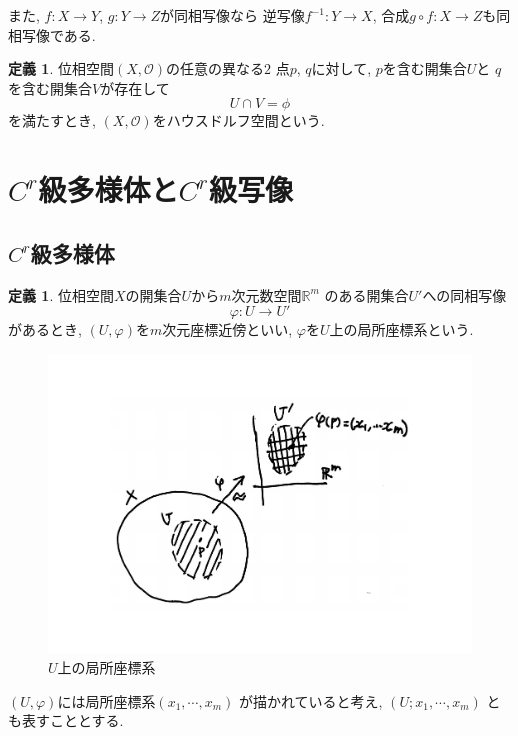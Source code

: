 \documentclass[a4j,12pt]{jarticle}
\theoremstyle{definition}
\newtheorem{definition}[theorem]{定義}
\begin{document}
また, $f:X\to Y$, $g:Y\to Z$が同相写像なら
逆写像$f^{-1}:Y\to X$, 
合成$g\circ f:X\to Z$も同相写像である. 

\begin{definition}\label{def:hausdorff space}
    位相空間$(X,\mathcal{O})$の任意の異なる$2$
    点$p$, $q$に対して, $p$を含む開集合$U$と
    $q$を含む開集合$V$が存在して
    $$U\cap V=\phi$$
    を満たすとき, 
    $(X,\mathcal{O})$をハウスドルフ空間という. 
\end{definition}
\newpage
%
\section{$C^r$級多様体と$C^r$級写像}
\subsection{$C^r$級多様体}
\begin{definition}
    位相空間$X$の開集合$U$から$m$次元数空間$\mathbb{R}^m$
    のある開集合$U'$への同相写像
    $$\varphi:U\rightarrow U'$$
    があるとき, $(U, \varphi)$を$m$次元座標近傍といい, 
    $\varphi$を$U$上の局所座標系という. 
\end{definition}
\begin{figure}[H]
    \centering
    \includegraphics[keepaspectratio, scale=0.4]
    {coNeighborhoodBig.pdf}
    \caption{$U$上の局所座標系}
    \label{coNeighborhood}
   \end{figure}
$(U,\varphi)$には局所座標系$(x_1, \cdots ,x_m)$
    が描かれていると考え, $(U;x_1, \cdots ,x_m)$
    とも表すこととする. 
\end{document}
